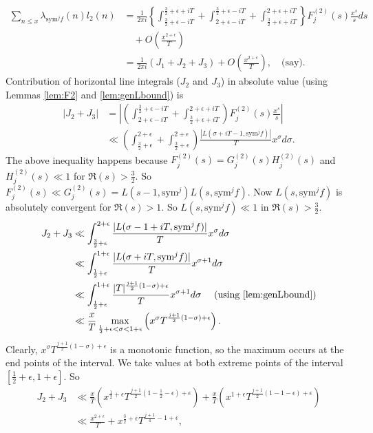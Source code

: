 \documentclass[10pt]{amsart}
\begin{document}
\begin{align} \label{eq:sum_l2}
    \sum_{n\leq x}\lambda_{\mathrm{sym}^{j}f}(n)l_2(n) & = \frac{1}{2\pi i}\left\{\int_{\frac{3}{2}+\epsilon-iT}^{\frac{3}{2}+\epsilon+iT}+\int_{2+\epsilon-iT}^{\frac{3}{2}+\epsilon-iT}+\int_{\frac{3}{2}+\epsilon+iT}^{2+\epsilon+iT}\right\}F_{j}^{(2)}(s)\frac{x^{s}}{s}ds \\
    &\quad + O\left(\frac{x^{2+\epsilon}}{T}\right) \\
    &= \frac{1}{2\pi i}(J_{1}+J_{2}+J_{3})+O\left(\frac{x^{2+\epsilon}}{T}\right), \quad \text{(say)}. 
\end{align}
Contribution of horizontal line integrals ($J_{2}$ and $J_{3}$) in absolute value (using Lemmas \ref{lem:F2} and \ref{lem:genLbound}) is
\begin{align*}
|J_2+J_3| &= \left| \left( \int_{2+\epsilon-iT}^{\frac{3}{2}+\epsilon-iT}+\int_{\frac{3}{2}+\epsilon+iT}^{2+\epsilon+iT} \right)F_j^{(2)}(s)\frac{x^s}{s}\right| \\
&\ll  \left( \int_{\frac{3}{2}+\epsilon}^{2+\epsilon} + \int_{\frac{3}{2}+\epsilon}^{2+\epsilon}\right) \frac{|L(\sigma+iT-1, \mathrm{sym}^j f)|}{T}x^\sigma d\sigma .
\end{align*}
The above inequality happens because $F_j^{(2)}(s)=G_j^{(2)}(s)H_j^{(2)}(s)$ and $H_j^{(2)}(s) \ll 1$ for $\Re(s) > \frac{3}{2}.$ So $F_j^{(2)}(s) \ll G_j^{(2)}(s) = L(s-1, \mathrm{sym}^j)L(s, \mathrm{sym}^j f )$. Now $L(s, \mathrm{sym}^j f)$ is absolutely convergent for $\Re(s) > 1$. So $L(s, \mathrm{sym}^j f) \ll 1$ in $\Re(s) > \frac{3}{2}$.
\begin{align*}
    J_2+J_3 &\ll \int_{\frac{3}{2}+\epsilon}^{2+\epsilon}\frac{|L(\sigma-1+iT , \mathrm{sym}^j f)|}{T} 
x^\sigma d\sigma \\
&\ll \int_{\frac{1}{2}+\epsilon}^{1+\epsilon} \frac{|L(\sigma+iT , \mathrm{sym}^j f)|}{T}x^{\sigma+1}d\sigma \\
&\ll \int_{\frac{1}{2}+\epsilon}^{1+\epsilon} \frac{|T|^{\frac{j+1}{2}(1-\sigma)+\epsilon}}{T}x^{\sigma+1}d\sigma \quad \text{ (using \ref{lem:genLbound})} \\
&\ll \frac{x}{T} \max_{\frac{1}{2}+\epsilon < \sigma < 1+\epsilon} \left( x^\sigma T^{\frac{j+1}{2}(1-\sigma)+\epsilon}\right) .
\end{align*}
Clearly, $x^\sigma T^{\frac{j+1}{2}(1-\sigma)+\epsilon}$ is a monotonic function, so the maximum occurs at the end points of the interval. We take values at both extreme points of the interval $[\frac{1}{2}+\epsilon, 1+\epsilon]$. So 
\begin{align*}
    J_2+J_3 &\ll \frac{x}{T}\left( x^{\frac{1}{2}+\epsilon}T^{\frac{j+1}{2} (1-\frac{1}{2}-\epsilon) +\epsilon} \right) +  \frac{x}{T}\left( x^{1+\epsilon}T^{\frac{j+1}{2} (1-1-\epsilon) +\epsilon}
    \right) \\
    &\ll \frac{x^{2+\epsilon}}{T}+x^{\frac{3}{2}+\epsilon}T^{\frac{j+1}{4}-1+\epsilon},
\end{align*}
\end{document}
